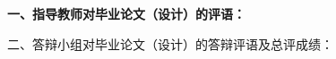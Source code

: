 \cleardoublepage{}

{
    \bfseries
    \noindent 一、指导教师对毕业论文（设计）的评语：\\
    \vskip 50mm

    \signature{指导教师（签名）}

    \noindent 二、答辩小组对毕业论文（设计）的答辩评语及总评成绩：\\

    \mbox{} \vfill

    \finaleval[][][][][]

    \signature{负责人（签名）}
}
